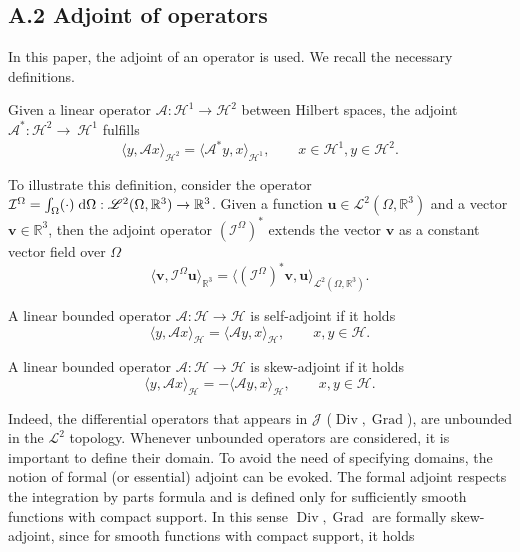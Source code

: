 \documentclass{svjour3}                     %
\DeclareMathOperator*{\Grad}{Grad}
\DeclareMathOperator*{\Div}{Div}
\begin{document}
	\subsection*{\normalsize \textbf{A.2 Adjoint of operators}}
	In this paper, the adjoint of an operator is used. We recall the necessary definitions.
	\begin{definition}
		Given a linear operator $\mathcal{A}: \mathscr{H}^1 \rightarrow \mathscr{H}^2$ between Hilbert spaces, the adjoint $\mathcal{A}^*:\mathscr{H}^2\rightarrow~\mathscr{H}^1$ fulfills 
		\begin{equation}
		\langle y, \mathcal{A}x \rangle_{\mathscr{H}^2} = \langle \mathcal{A}^* y, x \rangle_{\mathscr{H}^1}, \qquad x \in \mathscr{H}^1, y \in \mathscr{H}^2.
		\end{equation}
	\end{definition}
	To illustrate this definition, consider the operator $\mathcal{I}^\Omega = \int_\Omega (\cdot) \d\Omega : \mathscr{L}^2(\Omega, \mathbb{R}^3) \rightarrow \mathbb{R}^3$. Given a function $\bm{u} \in \mathscr{L}^2(\Omega, \mathbb{R}^3)$ and a vector $\bm{v} \in \mathbb{R}^3$, then the adjoint operator $(\mathcal{I}^\Omega)^*$ extends the vector $\bm{v}$ as a constant vector field over $\Omega$
	\begin{equation*} 
	\langle \bm{v}, \mathcal{I}^\Omega \bm{u} \rangle_{\mathbb{R}^3} = \langle (\mathcal{I}^\Omega)^* \bm{v},  \bm{u} \rangle_{\mathscr{L}^2(\Omega, \mathbb{R}^3)}. 
	\end{equation*}
	\begin{definition}
		A linear bounded operator $\mathcal{A}: \mathscr{H} \rightarrow \mathscr{H}$ is self-adjoint if it holds
		\begin{equation}
		\langle y, \mathcal{A}x \rangle_{\mathscr{H}} = \langle \mathcal{A} y, x \rangle_{\mathscr{H}}, \qquad x, y \in \mathscr{H}.
		\end{equation}
	\end{definition}
	\begin{definition}
		A linear bounded operator $\mathcal{A}: \mathscr{H} \rightarrow \mathscr{H}$ is  skew-adjoint if it holds
		\begin{equation}
		\langle y, \mathcal{A}x \rangle_{\mathscr{H}} = -\langle \mathcal{A} y, x \rangle_{\mathscr{H}}, \qquad x, y \in \mathscr{H}.
		\end{equation}	
	\end{definition}
	Indeed, the differential operators that appears in $\bm{\mathcal{J}}$ ($\Div, \Grad$), are unbounded in the $\mathscr{L}^2$ topology. Whenever unbounded operators are considered, it is important to define their domain. To avoid the need of specifying domains, the notion of formal (or essential) adjoint can be evoked. The formal adjoint respects the integration by parts formula and is defined only for sufficiently smooth functions with compact support. In this sense $\Div, \Grad$ are formally skew-adjoint, since for smooth functions with compact support, it holds
\end{document}
